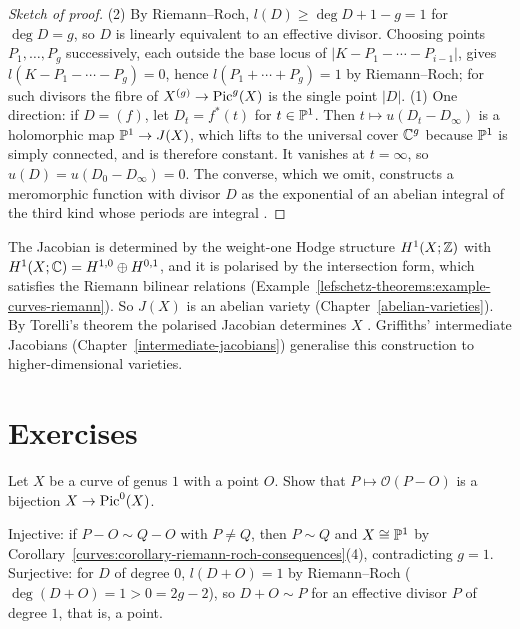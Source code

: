 \begin{proof}[Sketch of proof]
(2) By Riemann--Roch, $l(D) \geq \deg D + 1 - g = 1$ for $\deg D = g$, so $D$ is linearly equivalent to an effective divisor. Choosing points $P_1, \ldots, P_g$ successively,
each outside the base locus of $|K - P_1 - \cdots - P_{i-1}|$, gives $l(K - P_1 - \cdots - P_g) = 0$, hence $l(P_1 + \cdots + P_g) = 1$ by Riemann--Roch; for such divisors the fibre
of $X^{(g)} \to \operatorname{Pic}^g(X)$ is the single point $|D|$. (1) One direction: if $D = (f)$, let $D_t = f^*(t)$ for $t \in \mathbb{P}^1$. Then $t \mapsto u(D_t - D_\infty)$ is a holomorphic map
$\mathbb{P}^1 \to J(X)$, which lifts to the universal cover $\mathbb{C}^g$ because $\mathbb{P}^1$ is simply connected, and is therefore constant. It vanishes at $t = \infty$, so
$u(D) = u(D_0 - D_\infty) = 0$. The converse, which we omit, constructs a meromorphic function with divisor $D$ as the exponential of an abelian integral of the third kind whose
periods are integral \cite[Chapter 2, Section 2]{griffiths-harris}.
\end{proof}

\begin{remark}\label{curves:remark-jacobian-hodge}
The Jacobian is determined by the weight-one Hodge structure $H^1(X; \mathbb{Z})$ with $H^1(X; \mathbb{C}) = H^{1,0} \oplus H^{0,1}$, and it is polarised by the intersection form, which satisfies the
Riemann bilinear relations (Example~\ref{lefschetz-theorems:example-curves-riemann}). So $J(X)$ is an abelian variety (Chapter~\ref{abelian-varieties}). By Torelli's
theorem the polarised Jacobian determines $X$ \cite[Chapter 2, Section 7]{griffiths-harris}. Griffiths' intermediate Jacobians (Chapter~\ref{intermediate-jacobians}) generalise
this construction to higher-dimensional varieties.
\end{remark}

\section{Exercises}\label{curves:section-exercises}

\begin{exercise}\label{curves:exercise-elliptic-group}
Let $X$ be a curve of genus $1$ with a point $O$. Show that $P \mapsto \mathcal{O}(P - O)$ is a bijection $X \to \operatorname{Pic}^0(X)$.
\end{exercise}

\begin{solution}
Injective: if $P - O \sim Q - O$ with $P \neq Q$, then $P \sim Q$ and $X \cong \mathbb{P}^1$ by Corollary~\ref{curves:corollary-riemann-roch-consequences}(4), contradicting $g = 1$. Surjective:
for $D$ of degree $0$, $l(D + O) = 1$ by Riemann--Roch ($\deg(D + O) = 1 > 0 = 2g - 2$), so $D + O \sim P$ for an effective divisor $P$ of degree $1$, that is, a point.
\end{solution}

